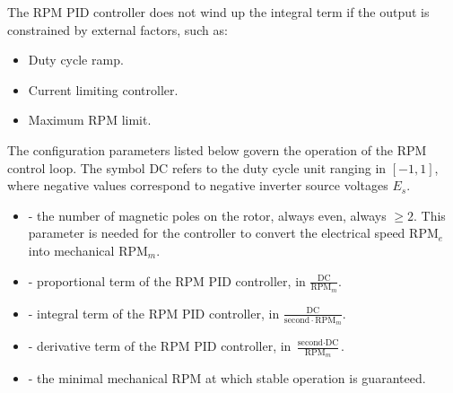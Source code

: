 \documentclass{zubaxdoc}
\begin{document}
	The RPM PID controller does not wind up the integral term if the output is constrained by external factors,
	such as:
	\begin{itemize}
		\item Duty cycle ramp.
		\item Current limiting controller.
		\item Maximum RPM limit.
	\end{itemize}
	
	The configuration parameters listed below govern the operation of the RPM control loop.
	The symbol $\text{DC}$ refers to the duty cycle unit ranging in $\left[-1, 1\right]$,
	where negative values correspond to negative inverter source voltages $E_s$.
	
	\begin{itemize}
		\item {} - the number of magnetic poles on the rotor, always even, always $\geq 2$.
		This parameter is needed for the controller to convert the electrical speed $\text{RPM}_e$
		into mechanical $\text{RPM}_m$.
		\item {} - proportional term of the RPM PID controller,
		in $\frac{\text{DC}}{\text{RPM}_m}$.
		\item {} - integral term of the RPM PID controller,
		in $\frac{\text{DC}}{\text{second}\cdot{}\text{RPM}_m}$.
		\item {} - derivative term of the RPM PID controller,
		in $\frac{\text{second}\cdot{}\text{DC}}{\text{RPM}_m}$.
		\item {} - the minimal mechanical RPM at which stable operation is guaranteed.
	\end{itemize}
	
\end{document}

